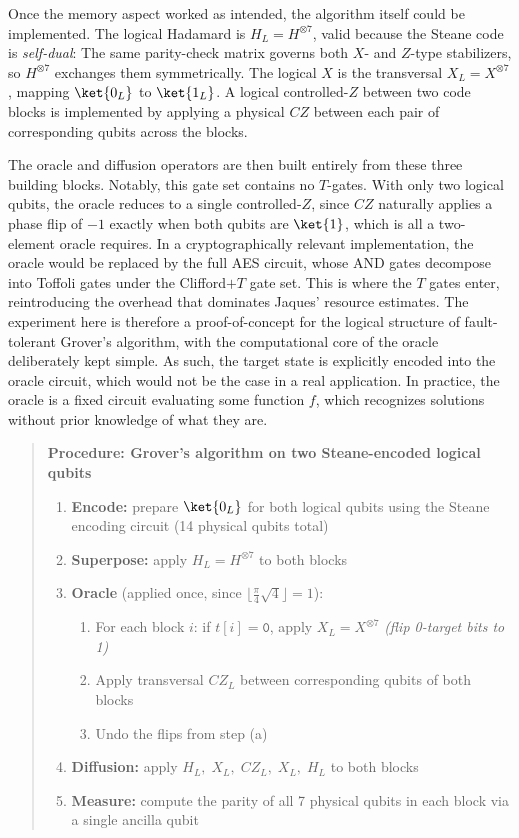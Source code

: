 Once the memory aspect worked as intended, the algorithm itself could be implemented. The logical Hadamard is $H_L = H^{\otimes 7}$, valid because the Steane code is \emph{self-dual}: The same parity-check matrix governs both $X$- and $Z$-type stabilizers, so $H^{\otimes 7}$ exchanges them symmetrically. The logical $X$ is the transversal $X_L = X^{\otimes 7}$, mapping $\ket{0_L}$ to $\ket{1_L}$. A logical controlled-$Z$ between two code blocks is implemented by applying a physical $CZ$ between each pair of corresponding qubits across the blocks.%

The oracle and diffusion operators are then built entirely from these three building blocks. Notably, this gate set contains no $T$-gates. With only two logical qubits, the oracle reduces to a single controlled-$Z$, since $CZ$ naturally applies a phase flip of $-1$ exactly when both qubits are $\ket{1}$, which is all a two-element oracle requires. In a cryptographically relevant implementation, the oracle would be replaced by the full AES circuit, whose AND gates decompose into Toffoli gates under the Clifford$+T$ gate set. This is where the $T$ gates enter, reintroducing the overhead that dominates Jaques' resource estimates. The experiment here is therefore a proof-of-concept for the logical structure of fault-tolerant Grover's algorithm, with the computational core of the oracle deliberately kept simple. As such, the target state is explicitly encoded into the oracle circuit, which would not be the case in a real application. In practice, the oracle is a fixed circuit evaluating some function $f$, which recognizes solutions without prior knowledge of what they are.

\begin{quote}
\textbf{Procedure: Grover's algorithm on two Steane-encoded logical qubits}
\begin{enumerate}
    \item \textbf{Encode:} prepare $\ket{0_L}$ for both logical qubits using the
          Steane encoding circuit (14 physical qubits total)
    \item \textbf{Superpose:} apply $H_L = H^{\otimes 7}$ to both blocks
    \item \textbf{Oracle} (applied once, since
          $\lfloor\tfrac{\pi}{4}\sqrt{4}\rfloor = 1$):
    \begin{enumerate}
        \item For each block $i$: if $t[i]=\texttt{0}$, apply $X_L = X^{\otimes 7}$
              \hfill\emph{(flip 0-target bits to 1)}
        \item Apply transversal $CZ_L$ between corresponding qubits of both blocks
        \item Undo the flips from step (a)
    \end{enumerate}
    \item \textbf{Diffusion:} apply $H_L,\; X_L,\; CZ_L,\; X_L,\; H_L$ to both
          blocks
    \item \textbf{Measure:} compute the parity of all 7 physical qubits in each block
          via a single ancilla qubit
\end{enumerate}
\end{quote}

